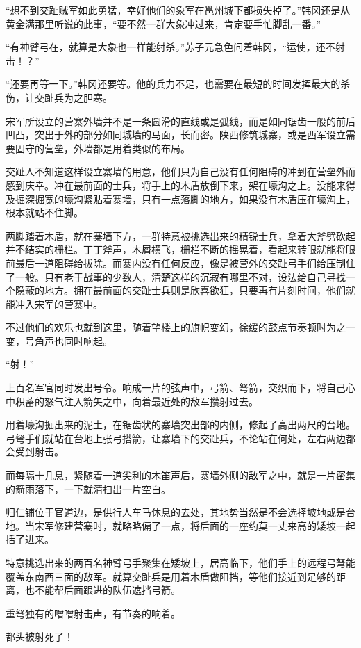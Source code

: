 “想不到交趾贼军如此勇猛，幸好他们的象军在邕州城下都损失掉了。”韩冈还是从黄金满那里听说的此事，“要不然一群大象冲过来，肯定要手忙脚乱一番。”

“有神臂弓在，就算是大象也一样能射杀。”苏子元急色问着韩冈，“运使，还不射击！？”

“还要再等一下。”韩冈还要等。他的兵力不足，也需要在最短的时间发挥最大的杀伤，让交趾兵为之胆寒。

宋军所设立的营寨外墙并不是一条圆滑的直线或是弧线，而是如同锯齿一般的前后凹凸，突出于外的部分如同城墙的马面，长而密。陕西修筑城寨，或是西军设立需要固守的营垒，外墙都是用着类似的布局。

交趾人不知道这样设立寨墙的用意，他们只为自己没有任何阻碍的冲到在营垒外而感到庆幸。冲在最前面的士兵，将手上的木盾放倒下来，架在壕沟之上。没能来得及掘深掘宽的壕沟紧贴着寨墙，只有一点落脚的地方，如果没有木盾压在壕沟上，根本就站不住脚。

两脚踏着木盾，就在寨墙下方，一群特意被挑选出来的精锐士兵，拿着大斧劈砍起并不结实的栅栏。丁丁斧声，木屑横飞，栅栏不断的摇晃着，看起来转眼就能将眼前最后一道阻碍给拔除。而寨内没有任何反应，像是被营外的交趾弓手们给压制住了一般。只有老于战事的少数人，清楚这样的沉寂有哪里不对，设法给自己寻找一个隐蔽的地方。拥在最前面的交趾士兵则是欣喜欲狂，只要再有片刻时间，他们就能冲入宋军的营寨中。

不过他们的欢乐也就到这里，随着望楼上的旗帜变幻，徐缓的鼓点节奏顿时为之一变，号角声也同时响起。

“射！”

上百名军官同时发出号令。响成一片的弦声中，弓箭、弩箭，交织而下，将自己心中积蓄的怒气注入箭矢之中，向着最近处的敌军攒射过去。

用着壕沟掘出来的泥土，在锯齿状的寨墙突出部的内侧，修起了高出两尺的台地。弓弩手们就站在台地上张弓搭箭，让寨墙下的交趾兵，不论站在何处，左右两边都会受到射击。

而每隔十几息，紧随着一道尖利的木笛声后，寨墙外侧的敌军之中，就是一片密集的箭雨落下，一下就清扫出一片空白。

归仁铺位于官道边，是供行人车马休息的去处，其地势当然是不会选择坡地或是台地。当宋军修建营寨时，就略略偏了一点，将后面的一座约莫一丈来高的矮坡一起括了进来。

特意挑选出来的两百名神臂弓手聚集在矮坡上，居高临下，他们手上的远程弓弩能覆盖东南西三面的敌军。就算交趾兵是用着木盾做阻挡，等他们接近到足够的距离，也不能帮后面跟进的队伍遮挡弓箭。

重弩独有的噌噌射击声，有节奏的响着。

都头被射死了！

